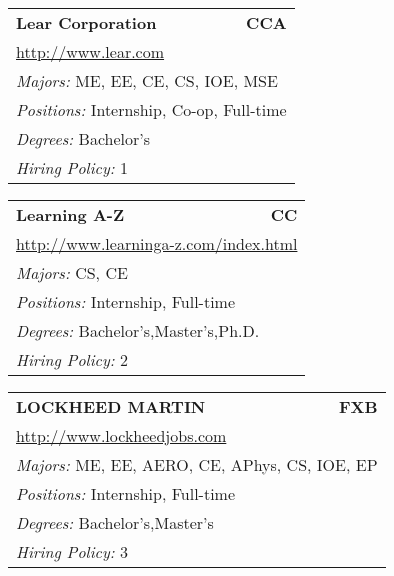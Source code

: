 \documentclass[twoside]{article}
\begin{document}
\begin{center}
\begin{multicols}{3}
\begin{FlushLeft}
\begin{minipage}{.9\columnwidth}
\end{minipage}
 
\begin{minipage}{.9\columnwidth}\begin{tabularx}{.95\columnwidth}{Xr}
                 {\Large\bf Lear Corporation} & {\Large\bf CCA}\\
    \multicolumn{2}{p{.95\columnwidth}}{\url{http://www.lear.com}}\\
    \multicolumn{2}{p{.95\columnwidth}}{\emph{Majors:} ME, EE, CE, CS, IOE, MSE}\\
    \multicolumn{2}{p{.95\columnwidth}}{\emph{Positions:} Internship, Co-op, Full-time}\\
    \multicolumn{2}{p{.95\columnwidth}}{\emph{Degrees:} Bachelor's}\\
    \multicolumn{2}{p{.95\columnwidth}}{\emph{Hiring Policy:} 1}\\
    \end{tabularx}
    
\end{minipage}
 
\begin{minipage}{.9\columnwidth}\begin{tabularx}{.95\columnwidth}{Xr}
                 {\Large\bf Learning A-Z} & {\Large\bf CC}\\
    \multicolumn{2}{p{.95\columnwidth}}{\url{http://www.learninga-z.com/index.html}}\\
    \multicolumn{2}{p{.95\columnwidth}}{\emph{Majors:} CS, CE}\\
    \multicolumn{2}{p{.95\columnwidth}}{\emph{Positions:} Internship, Full-time}\\
    \multicolumn{2}{p{.95\columnwidth}}{\emph{Degrees:} Bachelor's,Master's,Ph.D.}\\
    \multicolumn{2}{p{.95\columnwidth}}{\emph{Hiring Policy:} 2}\\
    \end{tabularx}
    
\end{minipage}
 
\begin{minipage}{.9\columnwidth}\begin{tabularx}{.95\columnwidth}{Xr}
                 {\Large\bf LOCKHEED MARTIN} & {\Large\bf FXB}\\
    \multicolumn{2}{p{.95\columnwidth}}{\url{http://www.lockheedjobs.com}}\\
    \multicolumn{2}{p{.95\columnwidth}}{\emph{Majors:} ME, EE, AERO, CE, APhys, CS, IOE, EP}\\
    \multicolumn{2}{p{.95\columnwidth}}{\emph{Positions:} Internship, Full-time}\\
    \multicolumn{2}{p{.95\columnwidth}}{\emph{Degrees:} Bachelor's,Master's}\\
    \multicolumn{2}{p{.95\columnwidth}}{\emph{Hiring Policy:} 3}\\
    \end{tabularx}
    

\end{minipage}
\end{FlushLeft}
\end{multicols}
\end{center}
\end{document}
